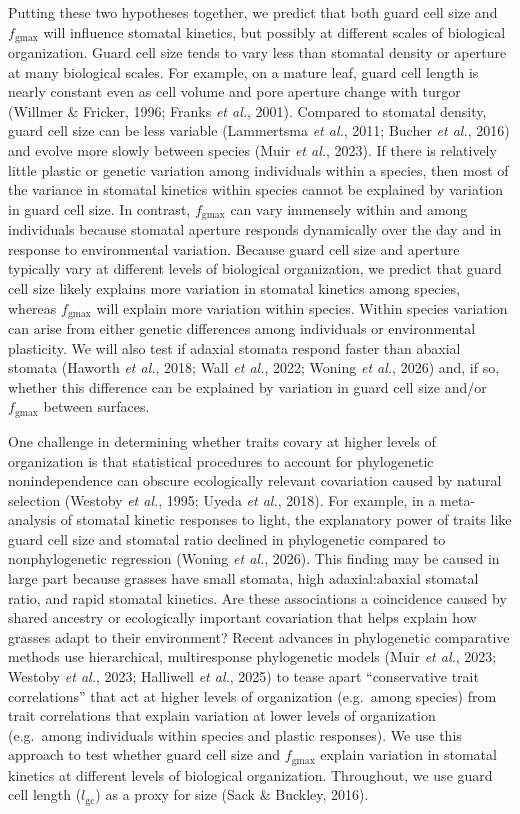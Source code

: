 \documentclass[
  letterpaper,
  DIV=11,
  numbers=noendperiod]{scrartcl}
\newcommand{\fgmax}{$f_\mathrm{gmax}$}
\newcommand{\gcl}{$l_\mathrm{gc}$}
\begin{document}
Putting these two hypotheses together, we predict that both guard cell
size and \fgmax{} will influence stomatal kinetics, but possibly at
different scales of biological organization. Guard cell size tends to
vary less than stomatal density or aperture at many biological scales.
For example, on a mature leaf, guard cell length is nearly constant even
as cell volume and pore aperture change with turgor (Willmer \& Fricker,
1996; Franks \emph{et al.}, 2001). Compared to stomatal density, guard
cell size can be less variable (Lammertsma \emph{et al.}, 2011; Bucher
\emph{et al.}, 2016) and evolve more slowly between species (Muir
\emph{et al.}, 2023). If there is relatively little plastic or genetic
variation among individuals within a species, then most of the variance
in stomatal kinetics within species cannot be explained by variation in
guard cell size. In contrast, \fgmax{} can vary immensely within and
among individuals because stomatal aperture responds dynamically over
the day and in response to environmental variation. Because guard cell
size and aperture typically vary at different levels of biological
organization, we predict that guard cell size likely explains more
variation in stomatal kinetics among species, whereas \fgmax{} will
explain more variation within species. Within species variation can
arise from either genetic differences among individuals or environmental
plasticity. We will also test if adaxial stomata respond faster than
abaxial stomata (Haworth \emph{et al.}, 2018; Wall \emph{et al.}, 2022;
Woning \emph{et al.}, 2026) and, if so, whether this difference can be
explained by variation in guard cell size and/or \fgmax{} between
surfaces.

One challenge in determining whether traits covary at higher levels of
organization is that statistical procedures to account for phylogenetic
nonindependence can obscure ecologically relevant covariation caused by
natural selection (Westoby \emph{et al.}, 1995; Uyeda \emph{et al.},
2018). For example, in a meta-analysis of stomatal kinetic responses to
light, the explanatory power of traits like guard cell size and stomatal
ratio declined in phylogenetic compared to nonphylogenetic regression
(Woning \emph{et al.}, 2026). This finding may be caused in large part
because grasses have small stomata, high adaxial:abaxial stomatal ratio,
and rapid stomatal kinetics. Are these associations a coincidence caused
by shared ancestry or ecologically important covariation that helps
explain how grasses adapt to their environment? Recent advances in
phylogenetic comparative methods use hierarchical, multiresponse
phylogenetic models (Muir \emph{et al.}, 2023; Westoby \emph{et al.},
2023; Halliwell \emph{et al.}, 2025) to tease apart ``conservative trait
correlations'' that act at higher levels of organization (e.g.~among
species) from trait correlations that explain variation at lower levels
of organization (e.g.~among individuals within species and plastic
responses). We use this approach to test whether guard cell size and
\fgmax{} explain variation in stomatal kinetics at different levels of
biological organization. Throughout, we use guard cell length (\gcl) as
a proxy for size (Sack \& Buckley, 2016).
\end{document}
